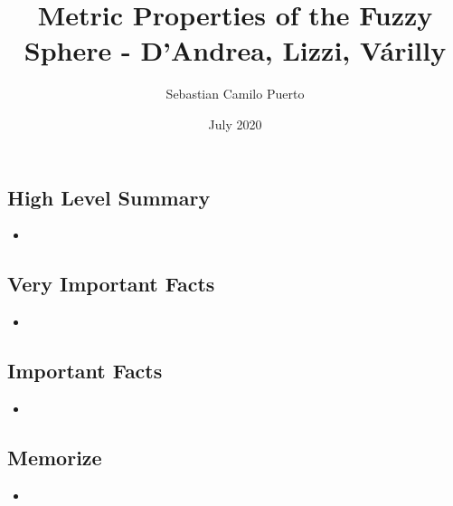 \documentclass{article}
\title{Metric Properties of the Fuzzy Sphere - D'Andrea, Lizzi, V\'arilly}
\author{Sebastian Camilo Puerto}
\date{July 2020}
\begin{document}
\maketitle

\tableofcontents

\subsection{High Level Summary}

    \begin{itemize}

    \item 
    
    \end{itemize}

\subsection{Very Important Facts}

    \begin{itemize}

    \item 
    
    \end{itemize}

\subsection{Important Facts}

    \begin{itemize}

    \item 
    
    \end{itemize}

\subsection{Memorize}

    \begin{itemize}

    \item 
    
    \end{itemize}
\end{document}
